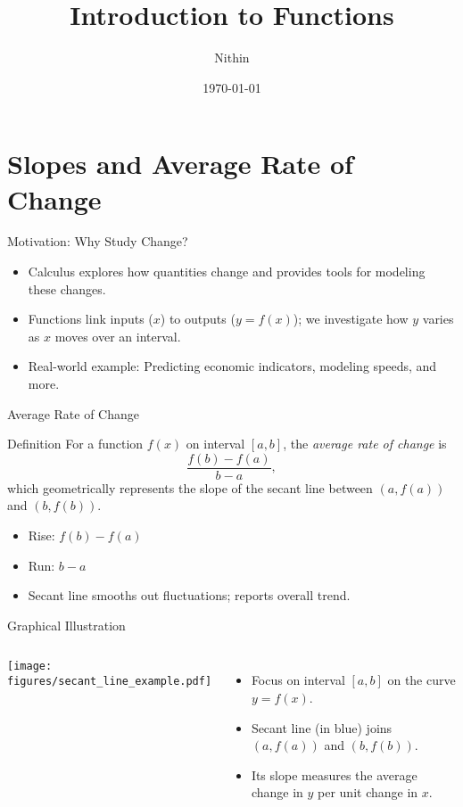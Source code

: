 \documentclass{beamer}
\title{Introduction to Functions}
\author{Nithin}
\institute{}
\date{\today}
\begin{document}
\begin{frame}
  \titlepage
\end{frame}
\begin{frame}
  \tableofcontents
\end{frame}
\section{Slopes and Average Rate of Change}

\begin{frame}{Motivation: Why Study Change?}
  \begin{itemize}
    \item Calculus explores how quantities change and provides tools for modeling these changes.
    \item Functions link inputs ($x$) to outputs ($y=f(x)$); we investigate how $y$ varies as $x$ moves over an interval.
    \item Real-world example: Predicting economic indicators, modeling speeds, and more.
  \end{itemize}
\end{frame}

\begin{frame}{Average Rate of Change}
  \begin{block}{Definition}
    For a function $f(x)$ on interval $[a,b]$, the \emph{average rate of change} is
    \[ 
      \frac{f(b)-f(a)}{b-a},
    \]
    which geometrically represents the slope of the secant line between $(a,f(a))$ and $(b,f(b))$.
  \end{block}
  \begin{itemize}
    \item Rise: $f(b)-f(a)$
    \item Run: $b-a$
    \item Secant line smooths out fluctuations; reports overall trend.
  \end{itemize}
\end{frame}

\begin{frame}{Graphical Illustration}
  \begin{columns}
      \texttt{[image: figures/secant\_line\_example.pdf]}
      \begin{itemize}
        \item Focus on interval $[a,b]$ on the curve $y=f(x)$.
        \item Secant line (in blue) joins $(a,f(a))$ and $(b,f(b))$.
        \item Its slope measures the average change in $y$ per unit change in $x$.
      \end{itemize}
  \end{columns}
\end{frame}
\end{document}
